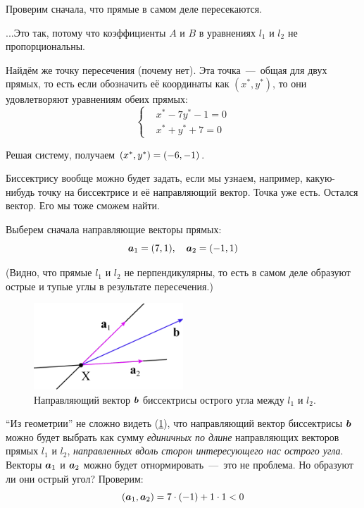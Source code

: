 \documentclass[a4paper,12pt]{article}
\begin{document}
  \begin{solution}
    Проверим сначала, что прямые в самом деле пересекаются.
    
    ...Это так, потому что коэффициенты $A$ и $B$ в уравнениях $l_1$ и $l_2$ не пропорциональны.
    
    Найдём же точку пересечения (почему нет).
    Эта точка~---~общая для двух прямых, то есть если обозначить её координаты как $(x^*, y^*)$, то они удовлетворяют уравнениям обеих прямых:
    \[
      \left\{
        \begin{aligned}
          &x^* - 7y^* - 1 = 0\\
          &x^* + y^* + 7 = 0
        \end{aligned}
      \right.
    \]
    
    Решая систему, получаем $(x^*, y^*) \hm= (-6, -1)$.
    
    Биссектрису вообще можно будет задать, если мы узнаем, например, какую-нибудь точку на биссектрисе и её направляющий вектор.
    Точка уже есть.
    Остался вектор.
    Его мы тоже сможем найти.
    
    Выберем сначала направляющие векторы прямых:
    \[
      \boldsymbol a_1 = (7, 1),\quad \boldsymbol a_2 = (-1, 1)
    \]
    
    (Видно, что прямые $l_1$ и $l_2$ не перпендикулярны, то есть в самом деле образуют острые и тупые углы в результате пересечения.)
    
    \begin{figure}[h]
      \centering
      
      \includegraphics[width=0.5\textwidth]{5-54}
      
      \caption{Направляющий вектор $\boldsymbol b$ биссектрисы острого угла между $l_1$ и $l_2$.}
      \label{fig:5-54}
    \end{figure}
    
    ``Из геометрии'' не сложно видеть (\ref{fig:5-54}), что направляющий вектор биссектрисы $\boldsymbol b$ можно будет выбрать как сумму \emph{единичных по длине} направляющих векторов прямых $l_1$ и $l_2$, \emph{направленных вдоль сторон интересующего нас острого угла}.
    Векторы $\boldsymbol a_1$ и $\boldsymbol a_2$ можно будет отнормировать~---~это не проблема.
    Но образуют ли они острый угол?
    Проверим:
    \[
      (\boldsymbol a_1, \boldsymbol a_2) = 7 \cdot (-1) + 1 \cdot 1 < 0
    \]
    

\end{solution}
\end{document}
